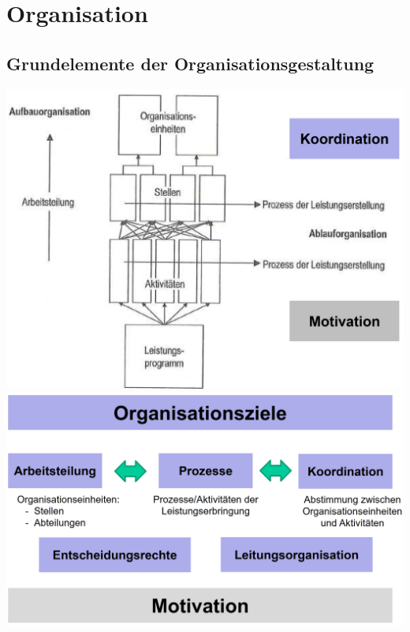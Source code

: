 \section{Organisation}
\subsection{Grundelemente der Organisationsgestaltung}
\begin{multicols}{2}
	\includegraphics[width=1\linewidth]{images/grundelemente_1}
	\includegraphics[width=1\linewidth]{images/grundelemente_2}
\end{multicols}


